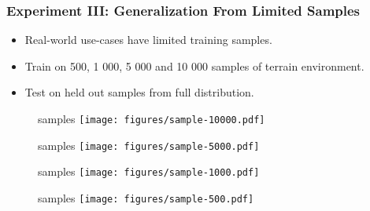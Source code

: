 \begin{frame}
    \frametitle{Experiment III: Generalization From Limited Samples}

    \begin{itemize}
        \item Real-world use-cases have limited training samples.
        \item Train on 500, 1 000, 5 000 and 10 000 samples of terrain environment.
        \item Test on held out samples from full distribution.
    \end{itemize}
\end{frame}

\begin{frame}
    \begin{figure}
         samples
        \texttt{[image: figures/sample-10000.pdf]}
    \end{figure}
\end{frame}

\begin{frame}
    \begin{figure}
         samples
        \texttt{[image: figures/sample-5000.pdf]}
    \end{figure}
\end{frame}

\begin{frame}
    \begin{figure}
         samples
        \texttt{[image: figures/sample-1000.pdf]}
    \end{figure}
\end{frame}

\begin{frame}
    \begin{figure}
         samples
        \texttt{[image: figures/sample-500.pdf]}
    \end{figure}
\end{frame}